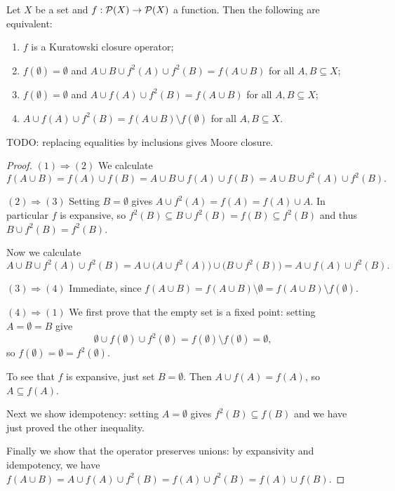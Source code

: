 \begin{proposition}
Let $X$ be a set and $f: \operatorname{\mathcal{P}}(X)\to \operatorname{\mathcal{P}}(X)$ a function. Then the following are equivalent:
\begin{enumerate}
\item $f$ is a Kuratowski closure operator;
\item $f(\emptyset) = \emptyset$ and $A\cup B\cup f^2(A) \cup f^2(B) = f(A\cup B)$ for all $A,B\subseteq X$;
\item $f(\emptyset) = \emptyset$ and $A\cup f(A) \cup f^2(B) = f(A\cup B)$ for all $A,B\subseteq X$;
\item $A\cup f(A) \cup f^2(B) = f(A\cup B) \setminus f(\emptyset)$ for all $A,B\subseteq X$.
\end{enumerate}
\end{proposition}
TODO: replacing equalities by inclusions gives Moore closure.
\begin{proof}
$(1) \Rightarrow (2)$ We calculate
\[ f(A\cup B) = f(A)\cup f(B) = A\cup B \cup f(A)\cup f(B) = A\cup B \cup f^2(A)\cup f^2(B). \]

$(2) \Rightarrow (3)$ Setting $B=\emptyset$ gives $A\cup f^2(A) = f(A) = f(A)\cup A$. In particular $f$ is expansive, so $f^2(B) \subseteq B\cup f^2(B) = f(B) \subseteq f^2(B)$ and thus $B\cup f^2(B) = f^2(B)$.

Now we calculate
\[ A\cup B\cup f^2(A) \cup f^2(B) = A\cup \big(A\cup f^2(A)\big) \cup \big(B\cup f^2(B)\big) = A\cup f(A) \cup f^2(B). \]

$(3) \Rightarrow (4)$ Immediate, since $f(A\cup B) = f(A\cup B) \setminus \emptyset = f(A\cup B) \setminus f(\emptyset)$.

$(4) \Rightarrow (1)$ We first prove that the empty set is a fixed point: setting $A=\emptyset = B$ give
\[ \emptyset \cup f(\emptyset) \cup f^2(\emptyset) = f(\emptyset)\setminus f(\emptyset) = \emptyset, \]
so $f(\emptyset) = \emptyset = f^2(\emptyset)$.

To see that $f$ is expansive, just set $B = \emptyset$. Then $A\cup f(A) = f(A)$, so $A\subseteq f(A)$.

Next we show idempotency: setting $A=\emptyset$ gives $f^2(B)\subseteq f(B)$ and we have just proved the other inequality.

Finally we show that the operator preserves unions: by expansivity and idempotency, we have $f(A\cup B) = A\cup f(A) \cup f^2(B) = f(A) \cup f^2(B) = f(A) \cup f(B)$.
\end{proof}

